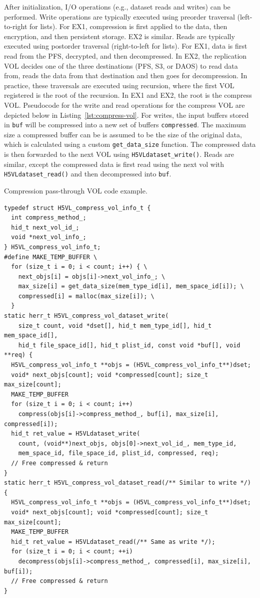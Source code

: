 After initialization, I/O operations (e.g., dataset reads and writes) can be performed. Write operations are typically executed using preorder traversal (left-to-right for lists). For EX1, compression is first applied to the data, then encryption, and then persistent storage. EX2 is similar. Reads are typically executed using postorder traversal (right-to-left for lists). For EX1, data is first read from the PFS, decrypted, and then decompressed. In EX2, the replication VOL decides one of the three destinations (PFS, S3, or DAOS) to read data from, reads the data from that destination and then goes for decompression. In practice, these traversals are executed using recursion, where the first VOL registered is the root of the recursion. In EX1 and EX2, the root is the compress VOL. Pseudocode for the write and read operations for the compress VOL are depicted below in Listing~\ref{lst:compress-vol}. For writes, the input buffers stored in \texttt{buf} will be compressed into a new set of buffers \texttt{compressed}. The maximum size a compressed buffer can be is assumed to be the size of the original data, which is calculated using a custom \texttt{get\_data\_size} function. The compressed data is then forwarded to the next VOL using \texttt{H5VLdataset\_write()}. Reads are similar, except the compressed data is first read using the next vol with \texttt{H5VLdataset\_read()} and then decompressed into \texttt{buf}.

\begin{listing}[!ht]
\centering
\caption{Compression pass-through VOL code example.}
\label{lst:compress-vol}
\begin{verbatim}
typedef struct H5VL_compress_vol_info_t {
  int compress_method_;
  hid_t next_vol_id_;
  void *next_vol_info_;
} H5VL_compress_vol_info_t;
#define MAKE_TEMP_BUFFER \
  for (size_t i = 0; i < count; i++) { \
    next_objs[i] = objs[i]->next_vol_info_; \
    max_size[i] = get_data_size(mem_type_id[i], mem_space_id[i]); \
    compressed[i] = malloc(max_size[i]); \
  }
static herr_t H5VL_compress_vol_dataset_write(
    size_t count, void *dset[], hid_t mem_type_id[], hid_t mem_space_id[],
    hid_t file_space_id[], hid_t plist_id, const void *buf[], void **req) {
  H5VL_compress_vol_info_t **objs = (H5VL_compress_vol_info_t**)dset;
  void* next_objs[count]; void *compressed[count]; size_t max_size[count];
  MAKE_TEMP_BUFFER
  for (size_t i = 0; i < count; i++)
    compress(objs[i]->compress_method_, buf[i], max_size[i], compressed[i]);
  hid_t ret_value = H5VLdataset_write(
    count, (void**)next_objs, objs[0]->next_vol_id_, mem_type_id,
    mem_space_id, file_space_id, plist_id, compressed, req);
  // Free compressed & return
}
static herr_t H5VL_compress_vol_dataset_read(/** Similar to write */) {
  H5VL_compress_vol_info_t **objs = (H5VL_compress_vol_info_t**)dset;
  void* next_objs[count]; void *compressed[count]; size_t max_size[count];
  MAKE_TEMP_BUFFER
  hid_t ret_value = H5VLdataset_read(/** Same as write */);
  for (size_t i = 0; i < count; ++i)
    decompress(objs[i]->compress_method_, compressed[i], max_size[i], buf[i]);
  // Free compressed & return
}
\end{verbatim}
\end{listing}


